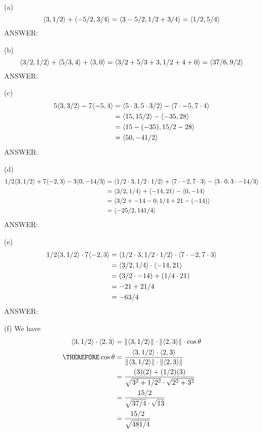\SOLUTION

(a) 
\[
\langle 3, 1/2 \rangle + \langle -5/2, 3/4 \rangle
= \langle 3 - 5/2, 1/2 + 3/4 \rangle 
= \langle 1/2, 5/4 \rangle
\]
ANSWER: 

(b) 
\[
\langle 3/2, 1/2 \rangle + \langle 5/3, 4 \rangle + \langle 3, 0 \rangle
= \langle 3/2 + 5/3 + 3, 1/2 + 4 + 0 \rangle
= \langle 37/6, 9/2 \rangle
\]
ANSWER: 

(c) 
\begin{align*}
5\langle 3, 3/2 \rangle - 7\langle -5, 4 \rangle &= \langle 5  \cdot  3, 5  \cdot  3/2 \rangle - \langle 7  \cdot  -5, 7  \cdot  4 \rangle\\
&= \langle 15, 15/2 \rangle - \langle -35, 28 \rangle\\
&= \langle 15 -(-35), 15/2 - 28 \rangle\\
&= \langle 50, -41/2 \rangle\\
\end{align*}
ANSWER: 

(d)
\begin{align*}
1/2\langle 3, 1/2 \rangle + 7\langle -2, 3 \rangle - 3\langle 0, -14/3 \rangle &= \langle 1/2 \cdot 3, 1/2 \cdot 1/2 \rangle + \langle 7 \cdot -2, 7 \cdot 3 \rangle - \langle 3 \cdot 0, 3 \cdot -14/3 \rangle\\
&= \langle 3/2, 1/4 \rangle + \langle -14, 21 \rangle - \langle 0, -14 \rangle\\
&= \langle 3/2 + -14 - 0, 1/4 + 21 -(-14) \rangle\\
&= \langle -25/2, 141/4 \rangle
\end{align*}
ANSWER: 

(e) 
\begin{align*}
1/2\langle 3, 1/2 \rangle \cdot 7\langle -2, 3 \rangle &= \langle 1/2 \cdot 3, 1/2 \cdot 1/2 \rangle \cdot \langle 7 \cdot -2, 7 \cdot 3 \rangle\\
&= \langle 3/2, 1/4 \rangle \cdot \langle -14, 21 \rangle\\
&= (3/2 \cdot -14) + (1/4 \cdot 21)\\
&= -21 + 21/4\\
&= -63/4
\end{align*}
ANSWER: 

(f) We have
\begin{align*}
\vv{3}{1/2} \cdot \vv{2}{3} &= \| \vv{3}{1/2} \|  
                               \cdot 
                               \| \vv{2}{3} \| 
                               \cdot
                               \cos \theta
\\
\THEREFORE \cos\theta     &= \frac {\vv{3}{1/2} \cdot \vv{2}{3}} 
                               {\| \vv{3}{1/2} \|  \cdot \| \vv{2}{3} \| }
\\
                          &= \frac {(3)(2) + (1/2)(3)}
                             {\sqrt{3^2 + 1/2^2} \cdot \sqrt{2^2 + 3^2}}
\\
                          &= \frac {15/2}
                             {\sqrt{37/4} \cdot \sqrt{13}}
\\
                          &= \frac{15/2}{\sqrt{481/4}}
\end{align*}


